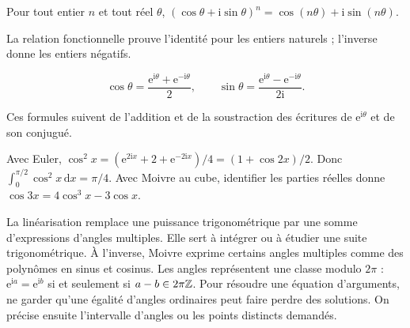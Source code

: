 \begin{theoreme}[Moivre]
Pour tout entier $n$ et tout réel $\theta$,
$(\cos\theta+\mathrm i\sin\theta)^n=\cos(n\theta)+\mathrm i\sin(n\theta)$.
\end{theoreme}
La relation fonctionnelle prouve l'identité pour les entiers naturels ; l'inverse donne les entiers négatifs.
\begin{propriete}[Euler]
\[\cos\theta=\frac{\mathrm e^{\mathrm i\theta}+\mathrm e^{-\mathrm i\theta}}2,
\qquad \sin\theta=\frac{\mathrm e^{\mathrm i\theta}-\mathrm e^{-\mathrm i\theta}}{2\mathrm i}.\]
\end{propriete}
Ces formules suivent de l'addition et de la soustraction des écritures de $\mathrm e^{\mathrm i\theta}$ et de son conjugué.
\begin{exemple}
Avec Euler, $\cos^2x=(\mathrm e^{2\mathrm ix}+2+\mathrm e^{-2\mathrm ix})/4=(1+\cos2x)/2$.
Donc $\int_0^{\pi/2}\cos^2x\,\mathrm dx=\pi/4$.
Avec Moivre au cube, identifier les parties réelles donne $\cos3x=4\cos^3x-3\cos x$.
\end{exemple}
La linéarisation remplace une puissance trigonométrique par une somme d'expressions d'angles multiples. Elle sert à intégrer ou à étudier une suite trigonométrique. À l'inverse, Moivre exprime certains angles multiples comme des polynômes en sinus et cosinus.
Les angles représentent une classe modulo $2\pi$ : $\mathrm e^{\mathrm ia}=\mathrm e^{\mathrm ib}$ si et seulement si $a-b\in2\pi\mathbb{Z}$.
Pour résoudre une équation d'arguments, ne garder qu'une égalité d'angles ordinaires peut faire perdre des solutions. On précise ensuite l'intervalle d'angles ou les points distincts demandés.

